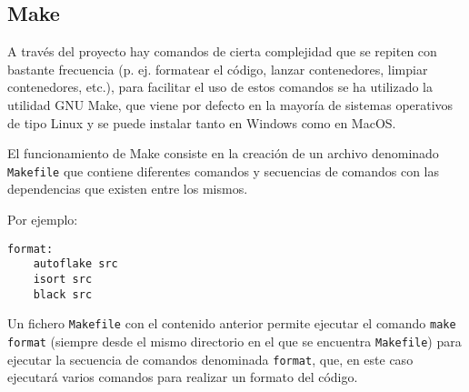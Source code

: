 \subsection{Make}

A través del proyecto hay comandos de cierta complejidad que se repiten con
bastante frecuencia (p. ej. formatear el código, lanzar contenedores, limpiar
contenedores, etc.), para facilitar el uso de estos comandos se ha utilizado la
utilidad GNU Make, que viene por defecto en la mayoría de sistemas operativos de
tipo Linux y se puede instalar tanto en Windows como en MacOS.

El funcionamiento de Make consiste en la creación de un archivo denominado
\texttt{Makefile} que contiene diferentes comandos y secuencias de comandos con
las dependencias que existen entre los mismos.

Por ejemplo:

\begin{verbatim}
format:
    autoflake src
    isort src
    black src
\end{verbatim}

Un fichero \texttt{Makefile} con el contenido anterior permite ejecutar el
comando \texttt{make format} (siempre desde el mismo directorio en el que se
encuentra \texttt{Makefile}) para ejecutar la secuencia de comandos denominada
\texttt{format}, que, en este caso ejecutará varios comandos para realizar un
formato del código.
